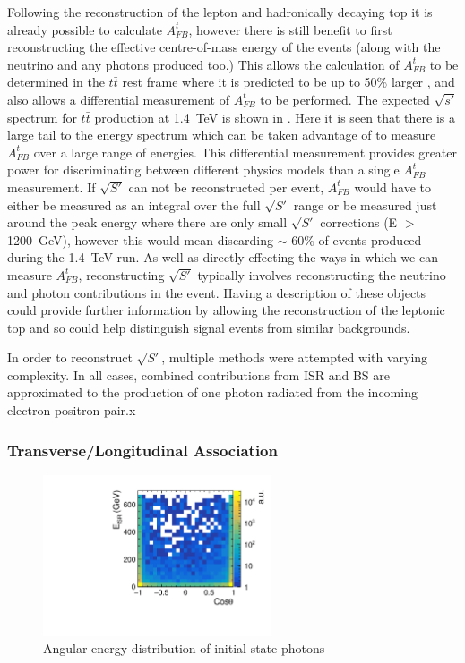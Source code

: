 Following the reconstruction of the lepton and hadronically decaying top it is already possible to calculate $A_{FB}^{t}$, however there is still benefit to first reconstructing the effective centre-of-mass energy of the events (along with the neutrino and any photons produced too.) This allows the calculation of $A_{FB}^{t}$ to be determined in the $t\bar{t}$ rest frame where it is predicted to be up to 50\% larger \cite{Krohn:2011tw}, and also allows a differential measurement of $A_{FB}^{t}$ to be performed. The expected $\sqrt{s'}$ spectrum for $t\bar{t}$ production at 1.4~TeV is shown in . Here it is seen that there is a large tail to the energy spectrum which can be taken advantage of to measure $A_{FB}^{t}$ over a large range of energies. This differential measurement provides greater power for discriminating between different physics models than a single $A_{FB}^{t}$ measurement. If $\sqrt{S'}$ can not be reconstructed per event, $A_{FB}^{t}$ would have to either be measured as an integral over the full $\sqrt{S'}$ range or be measured just around the peak energy where there are only small $\sqrt{S'}$ corrections (E $>$ 1200~GeV), however this would mean discarding $\sim$ 60\% of events produced during the 1.4~TeV run. As well as directly effecting the ways in which we can measure $A_{FB}^{t}$, reconstructing $\sqrt{S'}$ typically involves reconstructing the neutrino and photon contributions in the event. Having a description of these objects could provide further information by allowing the reconstruction of the leptonic top and so could help distinguish signal events from similar backgrounds.

In order to reconstruct $\sqrt{S'}$, multiple methods were attempted with varying complexity. In all cases, combined contributions from \ac{ISR} and \ac{BS} are approximated to the production of one photon radiated from the incoming electron positron pair.x

\subsubsection{Transverse/Longitudinal Association}

\begin{figure}
  \centering
  \includegraphics[width=0.6\textwidth]{TopAnalysis/figures/ISRSpectrum.pdf}
  \caption[Angular energy distribution of initial state photons]{Angular energy distribution of initial state photons}
  \label{fig:photonspectrum}
\end{figure}


